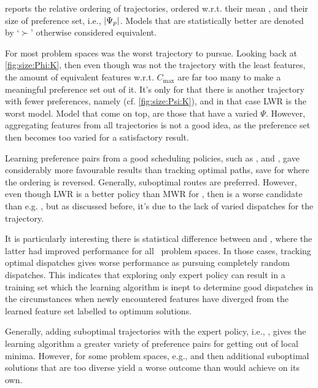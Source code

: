  reports the relative ordering of trajectories, 
ordered w.r.t. their mean \namerho, and their size of preference set, i.e., 
$\lvert\Psi_p\rvert$.
Models that are statistically better are denoted by `$\succ$' otherwise 
considered equivalent. 

For most problem spaces  was the worst trajectory to pursue. 
Looking back at \cref{fig:size:Phi:K}, then even though \PhiSet{\LPT} was not 
the trajectory with the least features, the amount of equivalent features 
w.r.t. $C_{\max}$ are far too many to make a meaningful preference set out of 
it. It's only for  that there is another trajectory with fewer 
preferences, namely  (cf. \cref{fig:size:Psi:K}), and in that 
case LWR is the worst model.
Model that come on top, are those that have a varied $\Psi$. However, 
aggregating features from all trajectories is not a good idea, as the 
preference set then becomes too varied for a satisfactory result. 





Learning preference pairs from a good scheduling policies, such as 
\PhiSet{\minCmax}, \PhiSet{\minRho} and \PhiSet{\MWR}, gave considerably more 
favourable results than tracking optimal paths, save for  where the 
ordering is reversed. Generally, suboptimal routes are preferred. 
However, even though LWR is a better policy than MWR for \FSP, then 
\PhiSet{\LWR} is a worse candidate than e.g. \PhiSet{\MWR}, but as discussed 
before, it's due to the lack of varied dispatches for the trajectory.

It is particularly interesting there is statistical difference between 
\PhiSet{\OPT} and \PhiSet{\RND}, where the latter had improved performance for 
all \JSP\ problem spaces. In those cases, tracking optimal dispatches gives 
worse performance as pursuing completely random dispatches. 
This indicates that exploring only expert policy can result in a 
training set which the learning algorithm is inept to determine good dispatches 
in the circumstances when newly encountered features have diverged from the 
learned feature set labelled to optimum solutions. 

Generally, adding suboptimal trajectories with the expert policy, i.e., 
\PhiSet{\ALL}, gives the learning algorithm a greater variety of preference 
pairs for getting out of local minima. However, for some problem spaces, e.g., 
 and  then additional suboptimal solutions that are too 
diverse yield a worse outcome than \PhiSet{\OPT} would achieve on its own.


